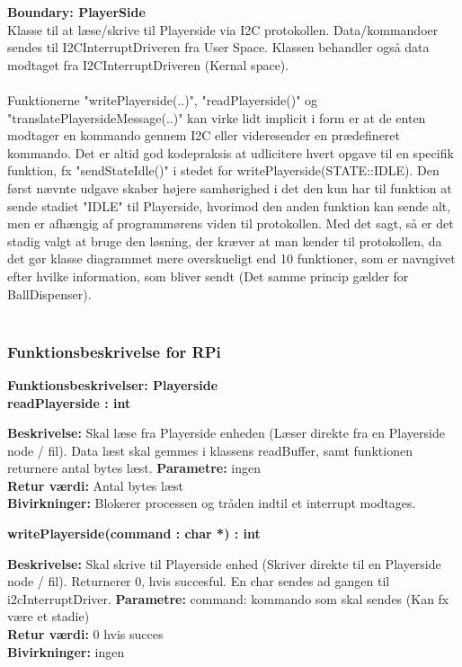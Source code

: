 \documentclass[Arkitektur/System_main.tex]{subfiles}
\begin{document}
\large{\textbf{Boundary:  PlayerSide}}\\
Klasse til at læse/skrive til Playerside via I2C protokollen. Data/kommandoer sendes til I2CInterruptDriveren fra User Space. Klassen behandler også data modtaget fra I2CInterruptDriveren (Kernal space). 
\\\\Funktionerne "writePlayerside(..)", "readPlayerside()" og "translatePlayersideMessage(..)" kan virke lidt implicit i form er at de enten modtager en kommando gennem I2C eller videresender en prædefineret kommando. Det er altid god kodepraksis at udlicitere hvert opgave til en specifik funktion, fx "sendStateIdle()" i stedet for writePlayerside(STATE::IDLE). Den først nævnte udgave skaber højere samhørighed i det den kun har til funktion at sende stadiet "IDLE" til Playerside, hvorimod den anden funktion kan sende alt, men er afhængig af programmørens viden til protokollen. Med det sagt, så er det stadig valgt at bruge den løsning, der kræver at man kender til protokollen, da det gør klasse diagrammet mere overskueligt end 10 funktioner, som er navngivet efter hvilke information, som bliver sendt (Det samme princip gælder for BallDispenser). \\\\
\subsubsection{Funktionsbeskrivelse for RPi}
{\large\textbf{Funktionsbeskrivelser: Playerside}}\\[0.2cm]
\textbf{readPlayerside : int}
\begin{adjustwidth}{1cm}{0pt}
\textbf{Beskrivelse:} Skal læse fra Playerside enheden (Læser direkte fra en Playerside node / fil). 
Data læst skal gemmes i klassens readBuffer, samt funktionen returnere antal bytes læst. 
\textbf{Parametre:} ingen \\[0.2cm]
\textbf{Retur værdi:} Antal bytes læst  \\[0.2cm]
\textbf{Bivirkninger:} Blokerer processen og tråden indtil et interrupt modtages. \\[0.2cm]
\end{adjustwidth}

\textbf{writePlayerside(command : char *) : int}
\begin{adjustwidth}{1cm}{0pt}
\textbf{Beskrivelse:} Skal skrive til Playerside enhed (Skriver direkte til en Playerside node / fil). Returnerer 0, hvis succesful. En char sendes ad gangen til i2cInterruptDriver. 
\textbf{Parametre:} command: kommando som skal sendes (Kan fx være et stadie) \\[0.2cm]
\textbf{Retur værdi:} 0 hvis succes  \\[0.2cm]
\textbf{Bivirkninger:} ingen \\[0.2cm]
\end{adjustwidth}
\end{document}
